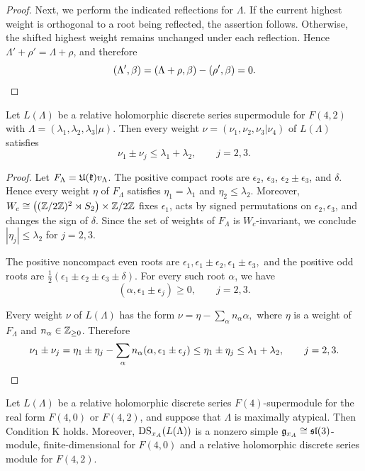 \begin{proof}
Next, we perform the indicated reflections for $\Lambda$. If the current highest weight is orthogonal to a root being reflected, the assertion follows. Otherwise, the shifted highest weight remains unchanged under each reflection. Hence $\Lambda'+\rho'=\Lambda+\rho$, and therefore
\begin{equation*}
(\Lambda',\beta)
=(\Lambda+\rho,\beta)-(\rho',\beta)=0.\qedhere
\end{equation*}
\end{proof}


\begin{lemma}\label{lemm::F4_weight_bound} 
Let $L(\Lambda)$ be a relative holomorphic discrete series supermodule for $F(4,2)$ with $\Lambda=(\lambda_1,\lambda_2,\lambda_3\vert\mu)$. Then every weight $\nu=(\nu_1,\nu_2,\nu_3\vert\nu_4)$ of $L(\Lambda)$ satisfies
\begin{equation*}
\nu_1\pm\nu_j\leq\lambda_1+\lambda_2,
\qquad j=2,3.
\end{equation*}
\end{lemma}


\begin{proof}
Let $F_{\Lambda}=\UE(\kk)v_\Lambda$. 
The positive compact roots are $\epsilon_2$, $\epsilon_3$, $\epsilon_2\pm\epsilon_3$, and $\delta$. Hence every weight $\eta$ of $F_\Lambda$ satisfies $\eta_1=\lambda_1$ and $\eta_2\leq\lambda_2$.
Moreover, 
$
W_c\cong\bigl((\ZZ/2\ZZ)^2\rtimes S_2\bigr)\times\ZZ/2\ZZ
$
fixes $\epsilon_1$, acts by signed permutations on $\epsilon_2,\epsilon_3$, and changes the sign of $\delta$. Since the set of weights of $F_{\Lambda}$ is $W_{c}$-invariant, we conclude $|\eta_j|\leq\lambda_2$ for $j=2,3$.


The positive noncompact even roots are
$
\epsilon_1,\epsilon_1\pm\epsilon_2,\epsilon_1\pm\epsilon_3,
$
and the positive odd roots are
$
\frac12(\epsilon_1\pm\epsilon_2\pm\epsilon_3\pm\delta).
$
For every such root $\alpha$, we have
\[
(\alpha,\epsilon_1\pm\epsilon_j)\geq0,
\qquad j=2,3.
\]

Every weight $\nu$ of $L(\Lambda)$ has the form
$
\nu=\eta-\sum_{\alpha}n_\alpha\alpha,
$
where $\eta$ is a weight of $F_\Lambda$ and $n_\alpha\in\ZZ_{\geq0}$. Therefore
\[
\nu_1\pm\nu_j
=\eta_1\pm\eta_j-\sum_\alpha n_\alpha(\alpha,\epsilon_1\pm\epsilon_j)
\leq\eta_1\pm\eta_j
\leq\lambda_1+\lambda_2,
\qquad j=2,3.\qedhere
\]
\end{proof}


\begin{proposition}
\label{prop::F4_condition_K}
Let $L(\Lambda)$ be a relative holomorphic discrete series $F(4)$-supermodule for the real form $F(4,0)$ or $F(4,2)$, and suppose that $\Lambda$ is maximally atypical. Then Condition K holds. Moreover, $\DS_{x_A}(L(\Lambda))$ is a nonzero simple $\gg_{x_A}\cong\sl(3)$-module, finite-dimensional for $F(4,0)$ and a relative holomorphic discrete series module for $F(4,2)$.

\end{proposition}


